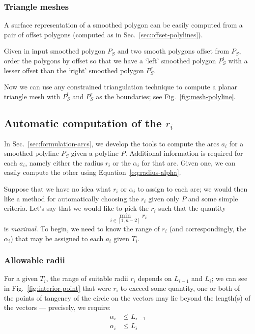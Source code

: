 \documentclass{article}
\begin{document}
\subsubsection{Triangle meshes}
%
A surface representation of a smoothed polygon can be easily computed from a pair of offset polygons (computed as in Sec.~\ref{sec:offset-polylines}).

Given in input smoothed polygon $P_S$ and two smooth polygons offset from $P_S$, order the polygons by offset so that we have a `left' smoothed polygon $P^l_S$ with a lesser offset than the `right' smoothed polygon $P^r_S$.

Now we can use any constrained triangulation technique to compute a planar triangle mesh with $P^l_S$ and $P^r_S$ as the boundaries; see Fig.~\ref{fig:mesh-polyline}.
%
\subsection{Automatic computation of the $r_i$}
%
In Sec.~\ref{sec:formulation-arcs}, we develop the tools to compute the arcs $a_{i}$ for a smoothed polyline $P_{S}$ given a polyline $P$.  Additional information is required for each $a_{i}$, namely either the radius $r_{i}$ or the $\alpha_i$ for that arc.  Given one, we can easily compute the other using Equation~\eqref{eq:radius-alpha}.

Suppose that we have no idea what $r_{i}$ or $\alpha_{i}$ to assign to each arc; we would then like a method for automatically choosing the $r_{i}$ given only $P$ and some simple criteria.  Let's say that we would like to pick the $r_{i}$ such that the quantity
%
\begin{equation}
  \label{eq:optimize-radius}
  \min_{i \in [1, n-2]} r_{i}
\end{equation}
%
is \emph{maximal}.  To begin, we need to know the range of $r_{i}$ (and correspondingly, the $\alpha_{i}$) that may be assigned to each $a_{i}$ given $T_{i}$.
%
\subsubsection{Allowable radii}
\label{sec:allowable-radii}
%
For a given $T_{i}$, the range of suitable radii $r_{i}$ depends on $L_{i-1}$ and $L_i$; we can see in Fig.~\ref{fig:interior-point} that were $r_{i}$ to exceed some quantity, one or both of the points of tangency of the circle on the vectors may lie beyond the length(s) of the vectors --- precisely, we require:
%
\begin{align}
  \label{eq:alphalimit-b}
  \alpha_i &\le L_{i-1}\\
  \label{eq:alphalimit-f}
  \alpha_i &\le L_{i}
\end{align}
%
\end{document}

